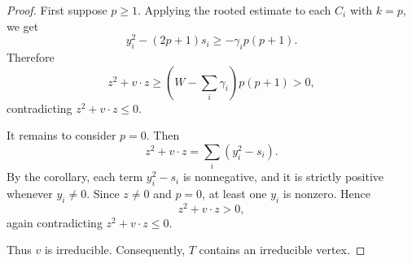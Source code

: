 \documentclass[12pt]{article}
\begin{document}
\begin{proof}
First suppose \(p\ge 1\). Applying the rooted estimate to each \(C_i\) with \(k=p\), we get
\[
y_i^2-(2p+1)s_i\ge -\gamma_i p(p+1).
\]
Therefore
\[
z^2+v\cdot z
\ge
\left(W-\sum_i\gamma_i\right)p(p+1)>0,
\]
contradicting \(z^2+v\cdot z\le 0\).

It remains to consider \(p=0\). Then
\[
z^2+v\cdot z
=
\sum_i (y_i^2-s_i).
\]
By the corollary, each term \(y_i^2-s_i\) is nonnegative, and it is strictly positive whenever \(y_i\ne 0\). Since \(z\ne 0\) and \(p=0\), at least one \(y_i\) is nonzero. Hence
\[
z^2+v\cdot z>0,
\]
again contradicting \(z^2+v\cdot z\le 0\).

Thus \(v\) is irreducible. Consequently, \(T\) contains an irreducible vertex.
\end{proof}
\end{document}
